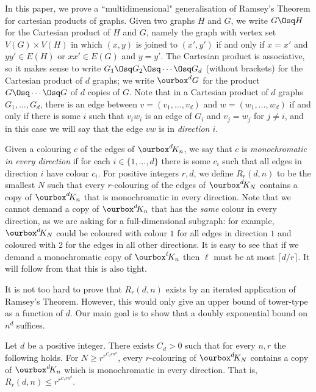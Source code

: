 In this paper, we prove a ``multidimensional" generalisation of Ramsey's Theorem for cartesian products of graphs. 
Given two graphs $H$ and $G$, we write $G\Osq H$ for the Cartesian product of $H$ and $G$, namely the graph 
with vertex set $V(G)\times V(H)$ in which $(x,y)$ is joined to $(x',y')$ if and only if $x=x'$ and $yy'\in E(H)$ 
or $xx'\in E(G)$ and $y=y'$.  The Cartesian product is associative, so it makes sense to write $G_1\Osq G_2\Osq\cdots\Osq G_d$ (without brackets) for the Cartesian product of $d$ graphs; we write $\ourbox^{d}G$ 
for the product $G\Osq\cdots\Osq G$ of $d$ copies of $G$. Note that in a Cartesian product of $d$ graphs $G_1,\dots,G_d$, there is an edge between $v=(v_1,\dots,v_d)$ and $w=(w_1,\dots,w_d)$ if and only if there is some $i$ such that $v_iw_i$ is an edge of $G_i$ and $v_j=w_j$ for $j\ne i$, and in this case we will say that the edge $vw$ is in {\em direction $i$}.

Given a colouring $c$ of the edges of $\ourbox^{d}\!K_n$, we say that $c$ is {\em monochromatic in every direction} if for each $i\in\{1,\dots,d\}$ there is some $c_i$ such that all edges in direction $i$ have colour $c_i$.  
For positive integers $r,d$, we define 
$R_r(d,n)$ to be the smallest $N$ such that every $r$-colouring of the edges of $\ourbox^{d}\!K_N$ contains a copy of $\ourbox^d\!K_n$ that is monochromatic in every direction.  Note that we cannot demand a copy of $\ourbox^{d}\!K_n$ that has the {\em same} colour in every direction, as we are asking for a full-dimensional subgraph: for example, $\ourbox^{d}\!K_N$ could be coloured with colour $1$ for all edges in direction $1$ and  coloured with 2 for the edges in all other directions. It is easy to see that if we demand a monochromatic copy of $\ourbox^{\ell}\!K_n$ then $\ell$ must be at most $\lceil d/r\rceil$. It will follow from  that this is also tight.
%
%

It is not too hard to prove that $R_r(d,n)$ exists by an iterated application of Ramsey's Theorem. However, this would only give an upper bound of tower-type as a function of $d$. Our main goal is to show that a doubly exponential bound on $n^{d}$ suffices. 
\begin{theorem}\label{thm:mainRamsey}
%
Let $d$ be a positive integer. There exists $C_d>0$ such that for every $n,r$ the following holds. 
For $N\geq r^{r^{C_drn^{d}}}$,
every $r$-colouring of $\ourbox^{d}\!K_N $ contains a copy of $\ourbox^{d}\!K_n$ which is monochromatic in every direction. That is, $R_r(d,n)\leq r^{r^{C_drn^d}}$.
\end{theorem}
